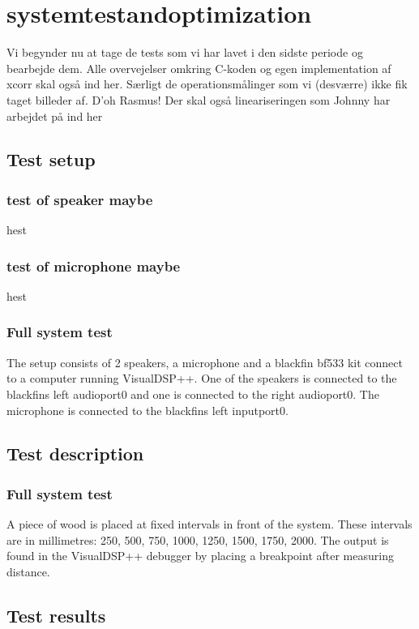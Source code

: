 \chapter{systemtestandoptimization}
Vi begynder nu at tage de tests som vi har lavet i den sidste periode og bearbejde dem. Alle overvejelser omkring C-koden og egen implementation af xcorr skal også ind her. Særligt de operationsmålinger som vi (desværre) ikke fik taget billeder af. D'oh Rasmus! Der skal også lineariseringen som Johnny har arbejdet på ind her
\section{Test setup}
\subsection{test of speaker maybe}
hest
\subsection{test of microphone maybe}
hest

\subsection{Full system test}
The setup consists of 2 speakers, a microphone and a blackfin bf533 kit connect to a computer running VisualDSP++. One of the speakers is connected to the blackfins left audioport0 and one is connected to the right audioport0. The microphone is connected to the blackfins left inputport0. 

\section{Test description}
\subsection{Full system test}
A piece of wood is placed at fixed intervals in front of the system. These intervals are in millimetres: 250, 500, 750, 1000, 1250, 1500, 1750, 2000. The output is found in the VisualDSP++ debugger by placing a breakpoint after measuring distance. 

\section{Test results}
